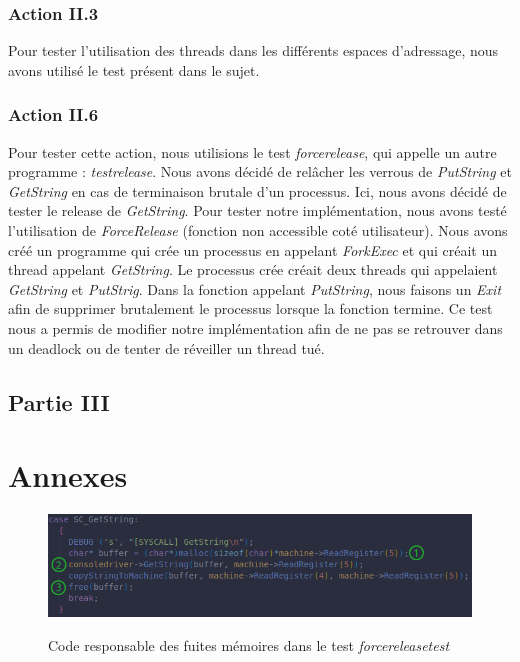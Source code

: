 \documentclass{article}
\begin{document}
\subsubsection{Action II.3}
Pour tester l'utilisation des threads dans les différents espaces d'adressage, nous avons utilisé le test présent dans le sujet.

\subsubsection{Action II.6}
Pour tester cette action, nous utilisions le test \textit{forcerelease}, qui appelle un autre programme : \textit{testrelease}.
Nous avons décidé de relâcher les verrous de \textit{PutString} et \textit{GetString} en cas de terminaison brutale d'un processus.
Ici, nous avons décidé de tester le release de \textit{GetString}.
Pour tester notre implémentation, nous avons testé l'utilisation de \textit{ForceRelease} (fonction non accessible coté utilisateur).
Nous avons créé un programme qui crée un processus en appelant \textit{ForkExec} et qui créait un thread appelant  \textit{GetString}.
Le processus crée créait deux threads qui appelaient  \textit{GetString} et  \textit{PutStrig}. Dans la fonction appelant \textit{PutString},
nous faisons un \textit{Exit} afin de supprimer brutalement le processus lorsque la fonction termine. Ce test nous a permis de modifier notre 
implémentation afin de ne pas se retrouver dans un deadlock ou de tenter de réveiller un thread tué.

\subsection{Partie III}

\section{Annexes}
\begin{figure}[h]
    \caption{Code responsable des fuites mémoires dans le test \textit{forcereleasetest}}
    \centering
    \includegraphics[width=\textwidth,height=\textheight,keepaspectratio]{Leak}
    \label{fig:fuites}
\end{figure}
\end{document}

